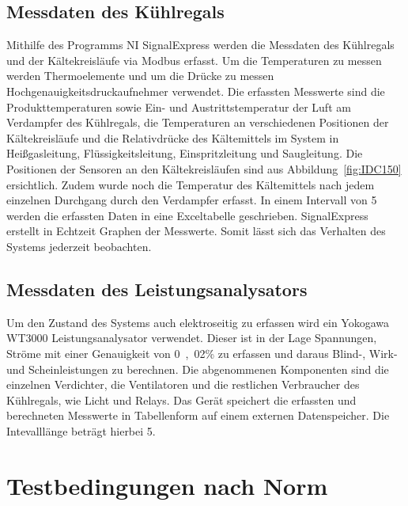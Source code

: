 \subsection{Messdaten des Kühlregals}
\label{subsec:Messdaten der Klimakammer}

Mithilfe des Programms NI SignalExpress werden die Messdaten des Kühlregals und der Kältekreisläufe via Modbus erfasst. Um die Temperaturen zu messen werden Thermoelemente  und um die Drücke zu messen Hochgenauigkeitsdruckaufnehmer verwendet. Die erfassten Messwerte sind die Produkttemperaturen sowie Ein- und Austrittstemperatur der Luft am Verdampfer des Kühlregals, die Temperaturen an verschiedenen Positionen der Kältekreisläufe und die Relativdrücke des Kältemittels im System in Heißgasleitung, Flüssigkeitsleitung, Einspritzleitung und Saugleitung. Die Positionen der Sensoren an den Kältekreisläufen sind aus Abbildung~\ref{fig:IDC150} ersichtlich. Zudem wurde noch die Temperatur des Kältemittels nach jedem einzelnen Durchgang durch den Verdampfer erfasst.
In einem Intervall von \unit{5}{\second} werden die erfassten Daten in eine Exceltabelle geschrieben. SignalExpress erstellt in Echtzeit Graphen der Messwerte. Somit lässt sich das Verhalten des Systems jederzeit beobachten.

\subsection{Messdaten des Leistungsanalysators}
\label{subsec:Messdaten des Leistungsanalysators}

Um den Zustand des Systems auch elektroseitig zu erfassen wird ein Yokogawa WT3000 Leistungsanalysator verwendet. Dieser ist in der Lage Spannungen, Ströme mit einer Genauigkeit von \unit{0,02}{\%} zu erfassen und daraus Blind-, Wirk- und Scheinleistungen zu berechnen. Die abgenommenen Komponenten sind die einzelnen Verdichter, die Ventilatoren und die restlichen Verbraucher des Kühlregals, wie Licht und Relays.
Das Gerät speichert die erfassten und berechneten Messwerte in Tabellenform auf einem externen Datenspeicher. Die Intevalllänge beträgt hierbei \unit{5}{\second}.


\section{Testbedingungen nach Norm}
\label{sec:Testbedingungen nach Norm}

